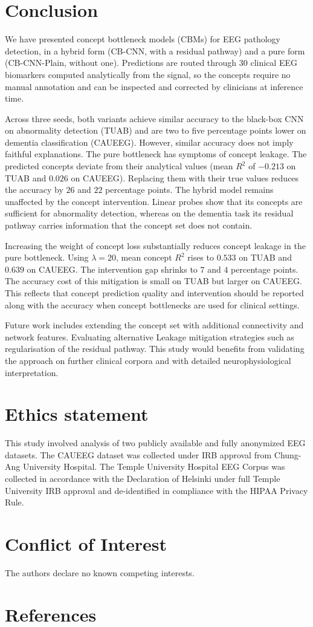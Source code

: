 \documentclass[journal,twoside,web]{ieeecolor}
\begin{document}
\section{Conclusion}
We have presented concept bottleneck models (CBMs) for EEG pathology detection, in a hybrid form (CB-CNN, with a residual pathway) and a pure form (CB-CNN-Plain, without one). Predictions are routed through 30 clinical EEG biomarkers computed analytically from the signal, so the concepts require no manual annotation and can be inspected and corrected by clinicians at inference time.

Across three seeds, both variants achieve similar accuracy to the black-box CNN on abnormality detection (TUAB) and are two to five percentage points lower on dementia classification (CAUEEG). However, similar accuracy does not imply faithful explanations. The pure bottleneck has symptoms of concept leakage. The predicted concepts deviate from their analytical values (mean $R^2$ of $-0.213$ on TUAB and $0.026$ on CAUEEG). Replacing  them with their true values reduces the accuracy by $26$ and $22$ percentage points. The hybrid model remains unaffected by the concept intervention. Linear probes show that its concepts are sufficient for abnormality detection, whereas on the dementia task its residual pathway carries information that the concept set does not contain.

Increasing the weight of concept loss substantially reduces concept leakage in the pure bottleneck. Using $\lambda = 20$, mean concept $R^2$ rises to $0.533$ on TUAB and $0.639$ on CAUEEG. The intervention gap shrinks to $7$ and $4$ percentage points. The accuracy cost of this mitigation is small on TUAB but larger on CAUEEG. This reflects that concept prediction quality and intervention should be reported along with the accuracy when concept bottlenecks are used for clinical settings.

Future work includes extending the concept set with additional connectivity and network features. Evaluating alternative Leakage mitigation strategies such as regularisation of the residual pathway. This study would benefits from validating the approach on further clinical corpora and with detailed neurophysiological interpretation.


\section*{Ethics statement}
This study involved analysis of two publicly available and fully anonymized EEG datasets. The CAUEEG dataset \cite{kim2023caueeg} was collected under IRB approval from Chung-Ang University Hospital. The Temple University Hospital EEG Corpus \cite{obeid2016} was collected in accordance with the Declaration of Helsinki under full Temple University IRB approval and de-identified in compliance with the HIPAA Privacy Rule.


\section*{Conflict of Interest}
The authors declare no known competing interests.

\section*{References}


\end{document}
